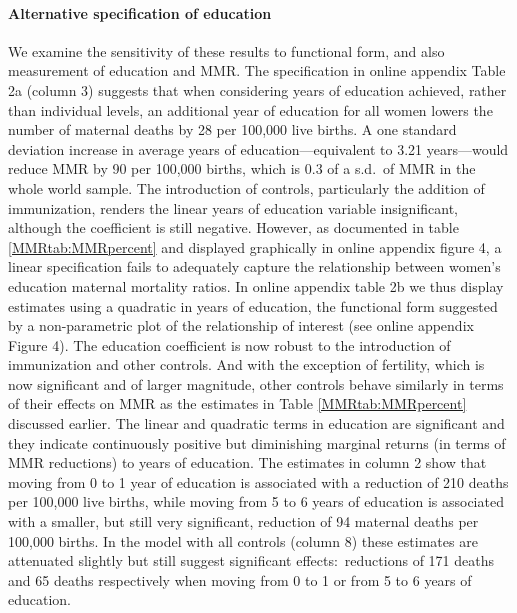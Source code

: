 \documentclass{article}[12pt,subeqn]
\begin{document}
\begin{spacing}{1.4}
\paragraph{Alternative specification of education}
We examine the sensitivity of these results to functional form, and also
measurement of education and MMR.  The specification in online appendix
Table 2a (column 3) suggests that when considering years of
education achieved, rather than individual levels, an additional year of
education for all women lowers the number of maternal deaths by 28 per
100,000 live births. A one standard deviation increase in average years of 
education---equivalent to 3.21 years---would reduce MMR by 90 per 100,000
births, which is 0.3 of a s.d.\ of MMR in the whole world sample. The
introduction of controls, particularly the addition of immunization, renders
the linear years of education variable insignificant, although the
coefficient is still negative.  However, as documented in table
\ref{MMRtab:MMRpercent} and displayed graphically in online appendix figure
4, a linear specification fails to adequately capture the relationship
between women's education maternal mortality ratios.  In online appendix
table 2b we thus display estimates using a quadratic in years of education,
the functional form suggested by a non-parametric plot of the relationship of
interest (see online appendix Figure 4). The education coefficient is now
robust to the introduction of immunization and other controls. And with the
exception of fertility, which is now significant and of larger magnitude, other
controls behave similarly in terms of their effects on MMR as the estimates in
Table \ref{MMRtab:MMRpercent} discussed earlier. The linear and quadratic terms
in education are significant and they indicate continuously positive but
diminishing marginal returns (in terms of MMR reductions) to years of education.
The estimates in column 2 show that moving from 0 to 1 year of education is
associated with a reduction of 210 deaths per 100,000 live births, while moving
from 5 to 6 years of education is associated with a smaller, but still very
significant, reduction of 94 maternal deaths per 100,000 births. In the model with
all controls (column 8) these estimates are attenuated slightly but still suggest
significant effects:\ reductions of 171 deaths and 65 deaths respectively when
moving from 0 to 1 or from 5 to 6 years of education.


\end{spacing}
\end{document}
